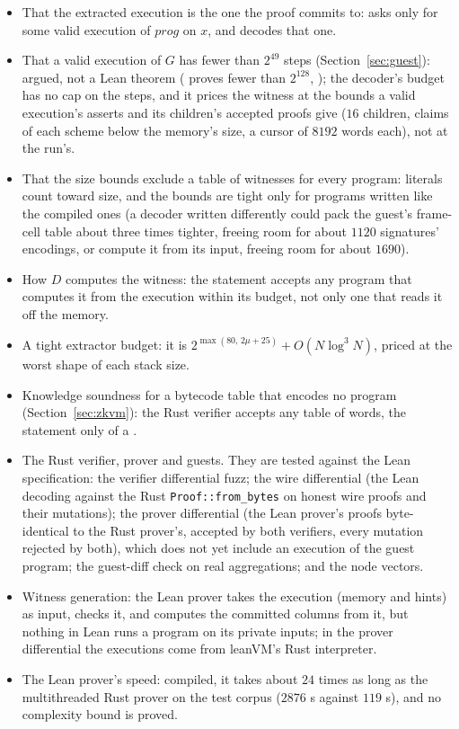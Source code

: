 \documentclass[11pt]{article}
\begin{document}
\begin{itemize}
bounds and budgets; the end theorem holds at 's compiled 
and  (,
).
\item That the extracted execution is the one the proof commits to: 
asks only for some valid execution of $\mathit{prog}$ on $x$, and  decodes that one.
\item That a valid execution of $G$ has fewer than $2^{49}$ steps (Section~\ref{sec:guest}): argued,
not a Lean theorem ( proves fewer than $2^{128}$, ); the
decoder's budget has no cap on the steps, and it prices the witness at the bounds a valid
execution's asserts and its children's accepted proofs give ($16$ children, claims of each scheme
below the memory's size, a cursor of $8192$ words each), not at the run's.
\item That the size bounds exclude a table of witnesses for every program: literals count toward
size, and the bounds are tight only for programs written like the compiled ones (a decoder
written differently could pack the guest's frame-cell table about three times tighter, freeing
room for about $1120$ signatures' encodings, or compute it from its input, freeing room for about $1690$).
\item How $D$ computes the witness: the statement accepts any program that computes it from the
execution within its budget, not only one that reads it off the memory.
\item A tight extractor budget: it is $2^{\max(80,\,2\mu + 25)} + O(N\log^3 N)$, priced at the worst shape of each stack size.
\item Knowledge soundness for a bytecode table that encodes no program (Section~\ref{sec:zkvm}): the Rust verifier accepts any table of words, the statement only  of a .
\item The Rust verifier, prover and guests. They are tested against the Lean specification: the
verifier differential fuzz; the wire differential (the Lean decoding against the Rust
\texttt{Proof::from\_bytes} on honest wire proofs and their mutations); the prover differential (the Lean prover's proofs byte-identical to the
Rust prover's, accepted by both verifiers, every mutation rejected by both), which does not yet
include an execution of the guest program; the guest-diff check on real aggregations; and the node
vectors.
\item Witness generation: the Lean prover takes the execution (memory and hints) as input, checks
it, and computes the committed columns from it, but nothing in Lean runs a program on its private
inputs; in the prover differential the executions come from leanVM's Rust interpreter.
\item The Lean prover's speed: compiled, it takes about $24$ times as long as the multithreaded
Rust prover on the test corpus ($2876$ s against $119$ s), and no complexity bound is proved.
\end{itemize}
\end{document}
